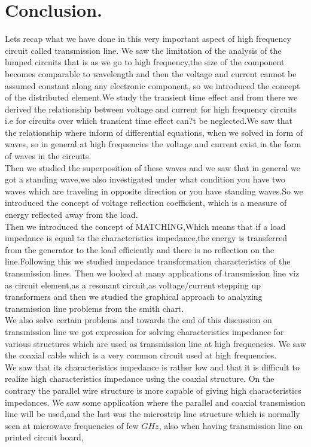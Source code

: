 \section{Conclusion.}
Lets recap what we have done in this very important aspect of high frequency circuit called transmission line. We saw the limitation of the analysis of the lumped circuits that is as we go to high frequency,the size of the component becomes comparable to wavelength and then the voltage and current cannot be assumed constant along any electronic component, so we introduced the concept of the distributed element.We study the transient time effect and from there we derived the relationship between voltage and current for high frequency circuits i.e for circuits over which transient time effect can?t be neglected.We saw that the relationship where inform of differential equations, when we solved in form of waves, so in general at high frequencies the voltage and current exist in the form of waves in the circuits.\\
Then we studied the superposition of these waves and we saw that in general we got a standing wave,we also investigated under what condition you have two waves which are traveling in opposite direction or you have standing waves.So we introduced the concept of voltage reflection coefficient, which is a measure of energy reflected away  from the load.\\
Then we introduced the concept of MATCHING,Which means that if a load impedance is equal to the characteristics impedance,the energy is transferred from the generator to the load efficiently and there is no reflection on the line.Following this we studied impedance transformation characteristics of the  transmission lines. Then we looked at many applications of transmission line viz as circuit element,as a resonant circuit,as voltage/current stepping up transformers  and then we studied the graphical approach to analyzing  transmission line problems from the smith chart.\\
We also solve certain problems and towards the end of this discussion on transmission line we got expression for solving characteristics impedance for various structures which are used as transmission line at high frequencies. We saw the coaxial cable which is a very common circuit used at high frequencies.\\
We saw that its characteristics impedance is rather low and that it is difficult to realize high characteristics impedance using the coaxial structure. On the contrary the parallel wire structure is more capable of giving high characteristics impedances. We saw some application where the parallel and coaxial transmission line will be used,and the last was the microstrip line structure which is normally seen at microwave frequencies of few $GHz$, also when having transmission line on printed circuit board, \\
